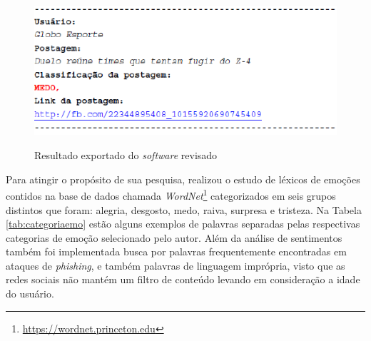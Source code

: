 \begin{figure}[!h]
\centering 
\caption{Resultado exportado do \textit{software} revisado}
\includegraphics[scale=0.60]{imagens/exportadofilipe.png}
\label{fig:exportadotccfilipe}
\end{figure}

\newpage
Para atingir o propósito de sua pesquisa,  realizou o estudo de léxicos de emoções contidos na base de dados chamada \textit{WordNet}\footnote{\url{https://wordnet.princeton.edu}} categorizados em seis grupos distintos que foram: alegria, desgosto, medo, raiva, surpresa e tristeza. Na Tabela \ref{tab:categoriaemo} estão alguns exemplos de palavras separadas pelas respectivas categorias de emoção selecionado pelo autor. Além da análise de sentimentos também foi implementada busca por palavras frequentemente encontradas em ataques de \textit{phishing},  e também palavras de linguagem imprópria, visto que as redes sociais não mantém um filtro de conteúdo levando em consideração a idade do usuário.

